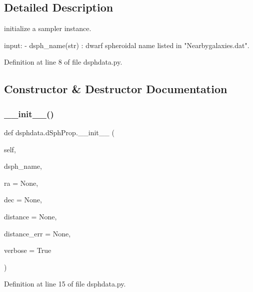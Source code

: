 \subsection{Detailed Description}
\begin{DoxyVerb}initialize a sampler instance.

input:
    - dsph_name(str)   : dwarf spheroidal name listed in "Nearbygalaxies.dat".
\end{DoxyVerb}
 

Definition at line 8 of file dsphdata.\+py.



\subsection{Constructor \& Destructor Documentation}
\mbox{\label{classdsphdata_1_1dSphProp_ae1a65e0fa31a216d8682f7b0c82a17bc}} 
\subsubsection{\texorpdfstring{\+\_\+\+\_\+init\+\_\+\+\_\+()}{\_\_init\_\_()}}
{\footnotesize\ttfamily def dsphdata.\+d\+Sph\+Prop.\+\_\+\+\_\+init\+\_\+\+\_\+ (\begin{DoxyParamCaption}\item[{}]{self,  }\item[{}]{dsph\+\_\+name,  }\item[{}]{ra = {\ttfamily None},  }\item[{}]{dec = {\ttfamily None},  }\item[{}]{distance = {\ttfamily None},  }\item[{}]{distance\+\_\+err = {\ttfamily None},  }\item[{}]{verbose = {\ttfamily True} }\end{DoxyParamCaption})}



Definition at line 15 of file dsphdata.\+py.



